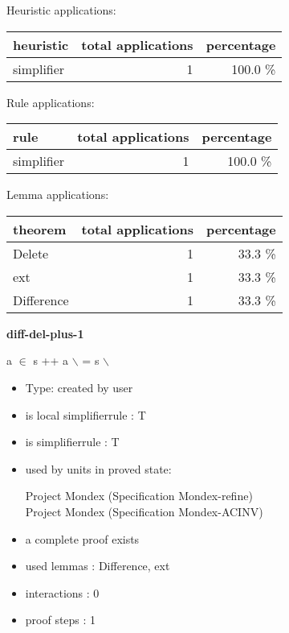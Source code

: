 \documentclass[a4paper]{article}
\begin{document}
\medskip


Heuristic applications:

\begin{supertabular}{l|r|r}
heuristic	& total applications & percentage \\ \hline
simplifier & 1 & 100.0 \% \\

\end{supertabular}

Rule applications:

\begin{supertabular}{l|r|r}
rule	        & total applications & percentage \\ \hline
simplifier & 1 & 100.0 \% \\

\end{supertabular}

Lemma applications:

\begin{supertabular}{l|r|r}
theorem	        & total applications & percentage \\ \hline
Delete & 1 & 33.3 \% \\
ext & 1 & 33.3 \% \\
Difference & 1 & 33.3 \% \\

\end{supertabular}
\pagebreak

{\LARGE\bf diff-del-plus-1}\label{lemma-diff-del-plus-1}

\medskip

 \Fol a $\in$  \Imp s ++ a $\backslash$  = s $\backslash$ 

\begin{itemize}

\item Type: created by user

\item is local simplifierrule : T
\item is simplifierrule : T
\item used by units in proved state:

Project Mondex (Specification Mondex-refine) \\
Project Mondex (Specification Mondex-ACINV)
\item       a complete proof exists
\item       used lemmas  : Difference, ext
\item       interactions : 0
\item       proof steps  : 1
\end{itemize}
\end{document}
